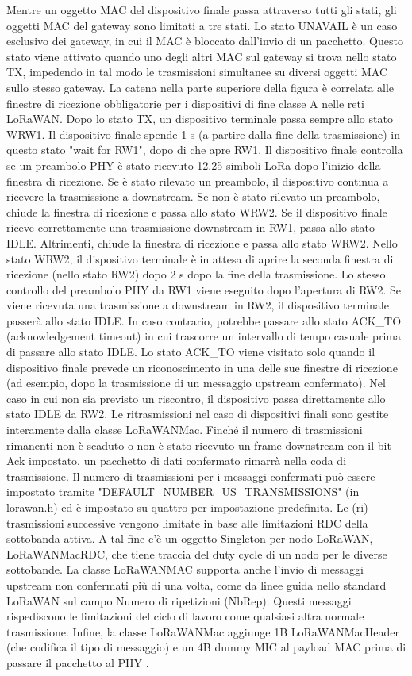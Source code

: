 \documentclass[a4paper]{report} %
\begin{document}
Mentre un oggetto MAC del dispositivo finale passa attraverso tutti gli stati, gli oggetti MAC del gateway sono limitati a tre stati. Lo stato UNAVAIL è un caso esclusivo dei gateway, in cui il MAC è bloccato dall'invio di un pacchetto. Questo stato viene attivato quando uno degli altri MAC sul gateway si trova nello stato TX, impedendo in tal modo le trasmissioni simultanee su diversi oggetti MAC sullo stesso gateway. La catena nella parte superiore della figura è correlata alle finestre di ricezione obbligatorie per i dispositivi di fine classe A nelle reti LoRaWAN. Dopo lo stato TX, un dispositivo terminale passa sempre allo stato WRW1. Il dispositivo finale spende 1 s (a partire dalla fine della trasmissione) in questo stato "wait for RW1", dopo di che apre RW1. Il dispositivo finale controlla se un preambolo PHY è stato ricevuto 12.25 simboli LoRa dopo l'inizio della finestra di ricezione. Se è stato rilevato un preambolo, il dispositivo continua a ricevere la trasmissione a downstream.
Se non è stato rilevato un preambolo, chiude la finestra di ricezione e passa allo stato WRW2. Se il dispositivo finale riceve correttamente una trasmissione downstream in RW1, passa allo stato IDLE. Altrimenti, chiude la finestra di ricezione e passa allo stato WRW2. Nello stato WRW2, il dispositivo terminale è in attesa di aprire la seconda finestra di ricezione (nello stato RW2) dopo 2 s dopo la fine della trasmissione. Lo stesso controllo del preambolo PHY da RW1 viene eseguito dopo l'apertura di RW2. Se viene ricevuta una trasmissione a downstream in RW2, il dispositivo terminale passerà allo stato IDLE. In caso contrario, potrebbe passare allo stato ACK\_TO (acknowledgement timeout) in cui trascorre un intervallo di tempo casuale prima di passare allo stato IDLE. Lo stato ACK\_TO viene visitato solo quando il dispositivo finale prevede un riconoscimento in una delle sue finestre di ricezione (ad esempio, dopo la trasmissione di un messaggio upstream confermato). Nel caso in cui non sia previsto un riscontro, il dispositivo passa direttamente allo stato IDLE da RW2. Le ritrasmissioni nel caso di dispositivi finali sono gestite interamente dalla classe LoRaWANMac. Finché il numero di trasmissioni rimanenti non è scaduto o non è stato ricevuto un frame downstream con il bit Ack impostato, un pacchetto di dati confermato rimarrà nella coda di trasmissione. Il numero di trasmissioni per i messaggi confermati può essere impostato tramite "DEFAULT\_NUMBER\_US\_TRANSMISSIONS" (in lorawan.h) ed è impostato su quattro per impostazione predefinita. Le (ri) trasmissioni successive vengono limitate in base alle limitazioni RDC della sottobanda attiva. A tal fine c'è un oggetto Singleton per nodo LoRaWAN, LoRaWANMacRDC, che tiene traccia del duty cycle di un nodo per le diverse sottobande. La classe LoRaWANMAC supporta anche l'invio di messaggi upstream non confermati più di una volta, come da linee guida nello standard LoRaWAN sul campo Numero di ripetizioni (NbRep). Questi messaggi rispediscono le limitazioni del ciclo di lavoro come qualsiasi altra normale trasmissione. Infine, la classe LoRaWANMac aggiunge 1B LoRaWANMacHeader (che codifica il tipo di messaggio) e un 4B dummy MIC al payload MAC prima di passare il pacchetto al PHY \cite{art:rif.49}.
\end{document}
